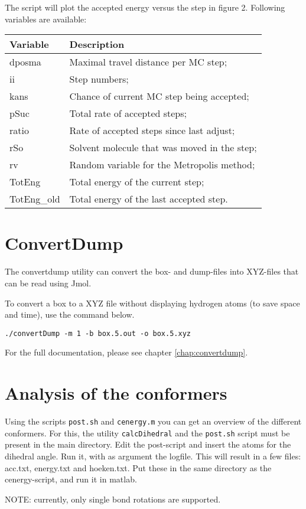 The script will plot the accepted energy versus the step in figure 2. Following 
variables are available:

\begin{tabular}{ll}
	Variable & Description \\ \hline
	dposma & Maximal travel distance per MC step; \\
	ii & Step numbers; \\
	kans & Chance of current MC step being accepted; \\
	pSuc & Total rate of accepted steps; \\
	ratio & Rate of accepted steps since last adjust; \\
	rSo & Solvent molecule that was moved in the step; \\
	rv & Random variable for the Metropolis method; \\
	TotEng & Total energy of the current step; \\
	TotEng\_old & Total energy of the last accepted step. \\
\end{tabular}

\section{ConvertDump}
The convertdump utility can convert the box- and dump-files into XYZ-files that 
can be read using Jmol.

To convert a box to a XYZ file without displaying hydrogen atoms (to save space 
and time), use the command below.

\begin{lstlisting}[caption=Convert a box to a XYZ file]
./convertDump -m 1 -b box.5.out -o box.5.xyz
\end{lstlisting}

For the full documentation, please see chapter \ref{chap:convertdump}.

\section{Analysis of the conformers}
Using the scripts \verb|post.sh| and \verb|cenergy.m| you can get an overview 
of the different conformers. For this, the utility \verb|calcDihedral| and the 
\verb|post.sh| script must be present in the main directory. Edit the 
post-script and insert the atoms for the dihedral angle. Run it, with as 
argument the logfile. This will result in a few files: acc.txt, energy.txt and 
hoeken.txt. Put these in the same directory as the cenergy-script, and run it 
in matlab.

NOTE: currently, only single bond rotations are supported.